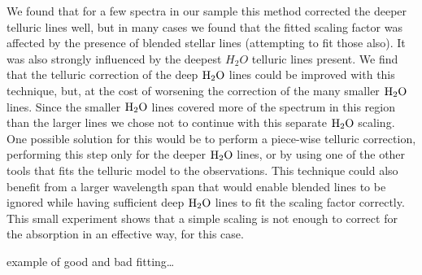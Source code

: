 We found that for a few spectra in our sample this method corrected the deeper telluric lines well, but in many cases we found that the fitted scaling factor was affected by the presence of blended stellar lines (attempting to fit those also). It was also strongly influenced by the deepest \(H_{2}O\) telluric lines present. We find that the telluric correction of the deep \(\rm H_{2}O \) lines could be improved with this technique, but, at the cost of worsening the correction of the many smaller \(\rm H_{2}O \) lines. Since the smaller \(\rm H_{2}O \) lines covered more of the spectrum in this region than the larger lines we chose not to continue with this separate \(\rm H_{2}O \) scaling. One possible solution for this would be to perform a piece-wise telluric correction, performing this step only for the deeper \( \rm H_{2}O\) lines, or by using one of the other tools that fits the telluric model to the observations. This technique could also benefit from a larger wavelength span that would enable blended lines to be ignored while having sufficient deep \(\rm H_{2}O\) lines to fit the scaling factor correctly. This small experiment shows that a simple scaling is not enough to correct for the absorption in an effective way, for this case.



 example of good and bad fitting\ldots



